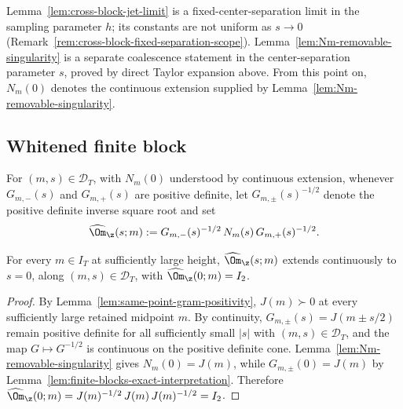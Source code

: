 \begin{remark}
\label{rem:Nm-coalescence-not-cross-limit}
Lemma~\ref{lem:cross-block-jet-limit} is a fixed-center-separation
limit in the sampling parameter \(h\); its constants are not uniform
as \(s\to 0\) (Remark~\ref{rem:cross-block-fixed-separation-scope}).
Lemma~\ref{lem:Nm-removable-singularity} is a separate coalescence
statement in the center-separation parameter \(s\), proved by direct
Taylor expansion above.  From this point on, \(N_m(0)\) denotes the
continuous extension supplied by Lemma~\ref{lem:Nm-removable-singularity}.
\end{remark}

\subsection{Whitened finite block}
\label{subsec:whitened-finite-block}

\begin{definition}
\label{def:whitened-finite-block}
For \((m,s)\in\mathcal D_T\), with \(N_m(0)\) understood by continuous
extension, whenever \(G_{m,-}(s)\) and \(G_{m,+}(s)\) are positive
definite, let \(G_{m,\pm}(s)^{-1/2}\) denote the positive definite
inverse square root and set
\begin{equation}
\label{eq:omega-finite}
\widehat\Om_\z(s;m)
:= G_{m,-}(s)^{-1/2}\,N_m(s)\,G_{m,+}(s)^{-1/2}.
\end{equation}
\end{definition}

\begin{corollary}[Coalescence: \(\widehat\Om_\z(0;m) = I_2\)]
\label{cor:omega-coalescence}
For every \(m\in I_T\) at sufficiently large height,
\(\widehat\Om_\z(s;m)\) extends continuously to \(s=0\), along
\((m,s)\in\mathcal D_T\), with \(\widehat\Om_\z(0;m) = I_2\).
\end{corollary}

\begin{proof}
By Lemma~\ref{lem:same-point-gram-positivity}, \(J(m)\succ 0\) at
every sufficiently large retained midpoint \(m\).  By continuity,
\(G_{m,\pm}(s) = J(m\pm s/2)\) remain positive definite for all
sufficiently small \(|s|\) with \((m,s)\in\mathcal D_T\), and the map
\(G\mapsto G^{-1/2}\) is continuous on the positive definite cone.
Lemma~\ref{lem:Nm-removable-singularity} gives \(N_m(0) = J(m)\),
while \(G_{m,\pm}(0) = J(m)\) by
Lemma~\ref{lem:finite-blocks-exact-interpretation}.  Therefore
\(\widehat\Om_\z(0;m) = J(m)^{-1/2}\,J(m)\,J(m)^{-1/2} = I_2\).
\end{proof}

